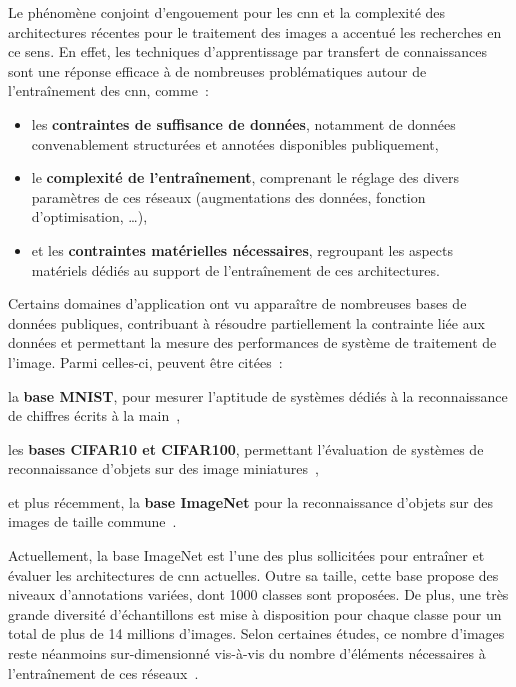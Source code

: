Le phénomène conjoint d'engouement pour les \gls{cnn} et la complexité des architectures récentes pour le traitement des images a accentué les recherches en ce sens. En effet, les techniques d'apprentissage par transfert de connaissances sont une réponse efficace à de nombreuses problématiques autour de l'entraînement des \gls{cnn}, comme~: 
\begin{itemize}
    \item les \textbf{contraintes de suffisance de données}, notamment de données convenablement structurées et annotées disponibles publiquement,
    \item le \textbf{complexité de l'entraînement}, comprenant le réglage des divers paramètres de ces réseaux (augmentations des données, fonction d'optimisation, \ldots),
    \item et les \textbf{contraintes matérielles nécessaires}, regroupant les aspects matériels dédiés au support de l'entraînement de ces architectures.
\end{itemize}\par

Certains domaines d'application ont vu apparaître de nombreuses bases de données publiques, contribuant à résoudre partiellement la contrainte liée aux données et permettant la mesure des performances de système de traitement de l'image. Parmi celles-ci, peuvent être citées~: 
\begin{inlinerate}
    \item la \textbf{base MNIST}, pour mesurer l'aptitude de systèmes dédiés à la reconnaissance de chiffres écrits à la main~\cite{lecun2010},
    \item les \textbf{bases CIFAR10 et CIFAR100}, permettant l'évaluation de systèmes de reconnaissance d'objets sur des image miniatures~\cite{Krizhevsky}, 
    \item et plus récemment, la \textbf{base ImageNet} pour la reconnaissance d'objets sur des images de taille commune~\cite{Deng2008}. 
\end{inlinerate}\par

Actuellement, la base ImageNet est l'une des plus sollicitées pour entraîner et évaluer les architectures de \gls{cnn} actuelles. Outre sa taille, cette base propose des niveaux d'annotations variées, dont 1000 classes sont proposées. De plus, une très grande diversité d'échantillons est mise à disposition pour chaque classe pour un total de plus de 14 millions d'images. Selon certaines études, ce nombre d'images reste néanmoins sur-dimensionné vis-à-vis du nombre d'éléments nécessaires à l'entraînement de ces réseaux~\cite{Huh2016}.\par

